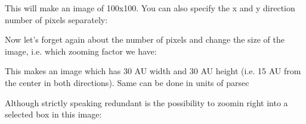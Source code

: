 \documentclass[letterpaper,10pt,english]{sphinxmanual}
\begin{document}
\begin{sphinxVerbatim}[commandchars=\\\{\}]
         
\end{sphinxVerbatim}

This will make an image of 100x100. You can also specify the x\sphinxhyphen{} and y\sphinxhyphen{} direction
number of pixels separately:

\begin{sphinxVerbatim}[commandchars=\\\{\}]
           
\end{sphinxVerbatim}

Now let’s forget again about the number of pixels and change the size of the
image, i.e. which zooming factor we have:

\begin{sphinxVerbatim}[commandchars=\\\{\}]
         
\end{sphinxVerbatim}

This makes an image which has 30 AU width and 30 AU height (i.e. 15 AU from the
center in both directions). Same can be done in units of parsec

\begin{sphinxVerbatim}[commandchars=\\\{\}]
         
\end{sphinxVerbatim}

Although strictly speaking redundant is the possibility to zoom\sphinxhyphen{}in right into a
selected box in this image:

\begin{sphinxVerbatim}[commandchars=\\\{\}]
            
\end{sphinxVerbatim}
\end{document}
